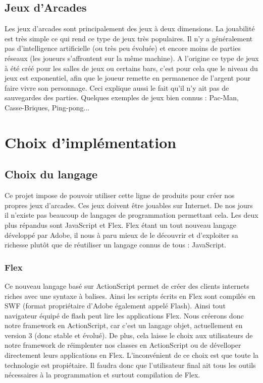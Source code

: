 \documentclass{article}
\begin{document}
	\subsection{Jeux d'Arcades}
		Les jeux d'arcades sont principalement des jeux à deux dimensions. La jouabilité est très simple ce qui rend ce type de jeux très populaires. Il n'y a généralement pas d'intelligence artificielle (ou très peu évoluée) et encore moins de parties réseaux (les joueurs s'affrontent sur la même machine).
		\ident A l'origine ce type de jeux à été créé pour les salles de jeux ou certains bars, c'est pour cela que le niveau du jeux est exponentiel, afin que le joueur remette en permanence de l'argent pour faire vivre son personnage. Ceci explique aussi le fait qu'il n'y ait pas de sauvegardes des parties.
		\ident Quelques exemples de jeux bien connus : Pac-Man, Casse-Briques, Ping-pong...

\newpage

\section{Choix d'implémentation}
	\subsection{Choix du langage}
		Ce projet impose de pouvoir utiliser cette ligne de produits pour créer nos propres jeux d'arcades. Ces jeux doivent être jouables sur Internet. De nos jours il n'existe pas beaucoup de langages de programmation permettant cela. Les deux plus répandus sont JavaScript et Flex. Flex étant un tout nouveau langage développé par Adobe, il nous à paru mieux de le découvrir et d'exploiter sa richesse plutôt que de réutiliser un langage connus de tous : JavaScript.
		\subsubsection{Flex}
			Ce nouveau langage basé sur ActionScript permet de créer des clients internets riches avec une syntaxe à balises. Ainsi les scripts écrits en Flex sont compilés en SWF (format propriétaire d'Adobe également appelé Flash). Ainsi tout navigateur équipé de flash peut lire les applications Flex.
			\ident Nous créerons donc notre framework en ActionScript, car c'est un langage objet, actuellement en version 3 (donc stable et évolué). De plus, cela laisse le choix aux utilisateurs de notre framework de réimplenter nos classes en ActionScript ou de dévelloper directement leurs applications en Flex.
			\ident L'inconvénient de ce choix est que toute la technologie est propiétaire. Il faudra donc que l'utilisateur final ait tous les outils nécessaires à la programmation et surtout compilation de Flex.
\end{document}
